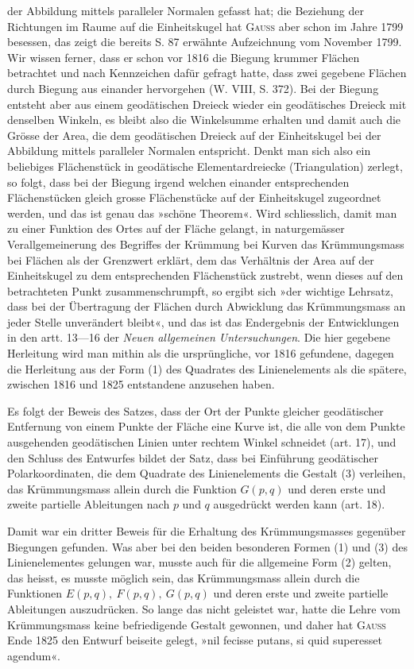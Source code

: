 der Abbildung mittels paralleler Normalen gefasst hat; die Beziehung
der Richtungen im Raume auf die Einheitskugel hat \textsc{Gauss} aber schon im
Jahre 1799 besessen, das zeigt die bereits S. 87 erwähnte Aufzeichnung vom
November 1799. Wir wissen ferner, dass er schon vor 1816 die Biegung
krummer Flächen betrachtet und nach Kennzeichen dafür gefragt hatte, dass
zwei gegebene Flächen durch Biegung aus einander hervorgehen (W. VIII,
S. 372). Bei der Biegung entsteht aber aus einem geodätischen Dreieck
wieder ein geodätisches Dreieck mit denselben Winkeln, es bleibt also die
Winkelsumme erhalten und damit auch die Grösse der Area, die dem geodätischen
Dreieck auf der Einheitskugel bei der Abbildung mittels paralleler
Normalen entspricht. Denkt man sich also ein beliebiges Flächenstück in
geodätische Elementardreiecke (Triangulation) zerlegt, so folgt, dass bei der
Biegung irgend welchen einander entsprechenden Flächenstücken gleich grosse
Flächenstücke auf der Einheitskugel zugeordnet werden, und das ist genau
das »schöne Theorem«. Wird schliesslich, damit man zu einer Funktion des
Ortes auf der Fläche gelangt, in naturgemässer Verallgemeinerung des Begriffes
der Krümmung bei Kurven das Krümmungsmass bei Flächen als der
Grenzwert erklärt, dem das Verhältnis der Area auf der Einheitskugel zu
dem entsprechenden Flächenstück zustrebt, wenn dieses auf den betrachteten
Punkt zusammenschrumpft, so ergibt sich »der wichtige Lehrsatz, dass bei der
Übertragung der Flächen durch Abwicklung das Krümmungsmass an jeder
Stelle unverändert bleibt«, und das ist das Endergebnis der Entwicklungen in
den artt. 13—16 der \textit{Neuen allgemeinen Untersuchungen}. Die hier gegebene
Herleitung wird man mithin als die ursprüngliche, vor 1816 gefundene, dagegen
die Herleitung aus der Form (1) des Quadrates des Linienelements als
die spätere, zwischen 1816 und 1825 entstandene anzusehen haben.
\par
Es folgt der Beweis des Satzes, dass der Ort der Punkte gleicher geodätischer
Entfernung von einem Punkte der Fläche eine Kurve ist, die alle
von dem Punkte ausgehenden geodätischen Linien unter rechtem Winkel
schneidet (art. 17), und den Schluss des Entwurfes bildet der Satz, dass bei
Einführung geodätischer Polarkoordinaten, die dem Quadrate des Linienelements
die Gestalt (3) verleihen, das Krümmungsmass allein durch die
\clearpage{}\setcounter{footnote}{0}
\noindent Funktion \(G(p,q)\) und deren erste und zweite partielle Ableitungen nach \(p\)
und \(q\) ausgedrückt werden kann (art. 18).
\par
Damit war ein dritter Beweis für die Erhaltung des Krümmungsmasses
gegenüber Biegungen gefunden. Was aber bei den beiden besonderen Formen
(1) und (3) des Linienelementes gelungen war, musste auch für die allgemeine
Form (2) gelten, das heisst, es musste möglich sein, das Krümmungsmass
allein durch die Funktionen \(E(p,q),\ F(p,q),\ G(p,q)\) und deren erste und
zweite partielle Ableitungen auszudrücken. So lange das nicht geleistet war,
hatte die Lehre vom Krümmungsmass keine befriedigende Gestalt gewonnen,
und daher hat \textsc{Gauss} Ende 1825 den Entwurf beiseite gelegt, »nil fecisse
putans, si quid superesset agendum«.
\clearpage\endgroup
